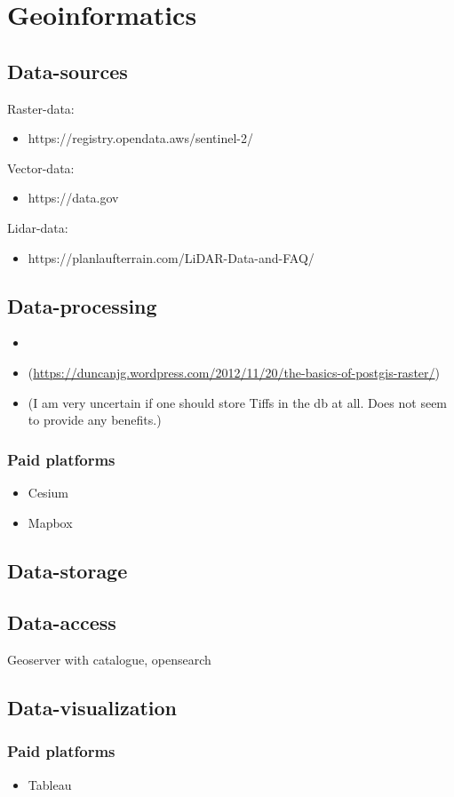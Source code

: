 \section{Geoinformatics}

\subsection{Data-sources}

Raster-data:
\begin{itemize}
    \item https://registry.opendata.aws/sentinel-2/
\end{itemize}

Vector-data:
\begin{itemize}
    \item https://data.gov
\end{itemize}

Lidar-data:
\begin{itemize}
    \item https://planlaufterrain.com/LiDAR-Data-and-FAQ/
\end{itemize}



\subsection{Data-processing}

\begin{itemize}
    \item {} 
    \item {} (\href{docs}{https://duncanjg.wordpress.com/2012/11/20/the-basics-of-postgis-raster/})
    \item {} (I am very uncertain if one should store Tiffs in the db at all. Does not seem to provide any benefits.)
\end{itemize}


\subsubsection{Paid platforms}
\begin{itemize}
    \item Cesium
    \item Mapbox
\end{itemize}


\subsection{Data-storage}

\subsection{Data-access}
Geoserver with catalogue, opensearch

\subsection{Data-visualization}

\subsubsection{Paid platforms}
\begin{itemize}
    \item Tableau
\end{itemize}